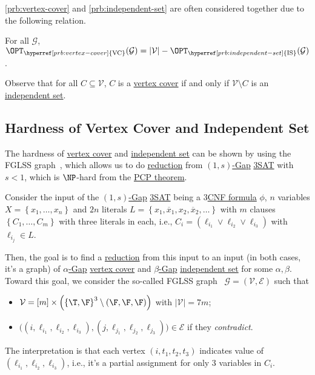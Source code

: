 \autoref{prb:vertex-cover} and \autoref{prb:independent-set} are often considered together due to the following relation.

\begin{claim}
	For all \(\mathcal{G} \), \(\OPT_{\hyperref[prb:vertex-cover]{\text{VC}}}(\mathcal{G} ) = \vert \mathcal{V} \vert - \OPT_{\hyperref[prb:independent-set]{\text{IS}}}(\mathcal{G} )\).
\end{claim}
\begin{explanation}
	Observe that for all \(C \subseteq \mathcal{V} \), \(C\) is a \hyperref[prb:vertex-cover]{vertex cover} if and only if \(\mathcal{V} \setminus C\) is an \hyperref[prb:independent-set]{independent set}.
\end{explanation}

\subsection{Hardness of Vertex Cover and Independent Set}
The hardness of \hyperref[prb:vertex-cover]{vertex cover} and \hyperref[prb:independent-set]{independent set} can be shown by using the FGLSS graph~\cite{10.1145/226643.226652}, which allows us to do \hyperref[def:reduction]{reduction} from \hyperref[def:c-s-Gap]{\((1, s)\)-Gap} \hyperref[prb:max-3SAT]{3SAT} with \(s < 1\), which is \(\NP\)-hard from the \hyperref[thm:PCP]{PCP theorem}.

Consider the input of the \hyperref[def:c-s-Gap]{\((1, s)\)-Gap} \hyperref[prb:max-3SAT]{3SAT} being a \hyperref[def:k-CNF]{\(3\)CNF formula} \(\phi \), \(n\) variables \(X=\left\{ x_1, \ldots , x_n\right\}\) and \(2n\) literals \(L = \left\{ x_1, \overline{x}_1, x_2, \overline{x}_2, \ldots \right\}\) with \(m\) clauses \(\left\{ C_1, \ldots , C_m \right\} \) with three literals in each, i.e., \(C_i = (\ell _{i_1} \lor \ell _{i_2} \lor \ell _{i_3}) \) with \(\ell _{i_j}\in L\).

Then, the goal is to find a \hyperref[def:reduction]{reduction} from this input to an input (in both cases, it's a graph) of \hyperref[def:Gap]{\(\alpha\)-Gap} \hyperref[prb:vertex-cover]{vertex cover} and \hyperref[def:Gap]{\(\beta \)-Gap} \hyperref[prb:independent-set]{independent set} for some \(\alpha , \beta \). Toward this goal, we consider the so-called FGLSS graph~\cite{10.1145/226643.226652} \(\mathcal{G} =(\mathcal{V} , \mathcal{E} )\) such that
\begin{itemize}
	\item \(\mathcal{V} = [m]\times \left( \left\{ \T, \F \right\} ^3 \setminus (\F, \F, \F) \right)\) with \(\vert \mathcal{V}  \vert = 7m\);
	\item \(\big((i, \ell _{i_1}, \ell _{i_2}, \ell _{i_3}), (j, \ell _{j_1}, \ell _{j_2}, \ell _{j_3})\big)\in \mathcal{E} \) if they \emph{contradict}.
\end{itemize}
The interpretation is that each vertex \((i, t_1, t_2, t_3)\) indicates value of \((\ell _{i_1}, \ell _{i_2}, \ell _{i_3})\), i.e., it's a partial assignment for only \(3\) variables in \(C_i\).

